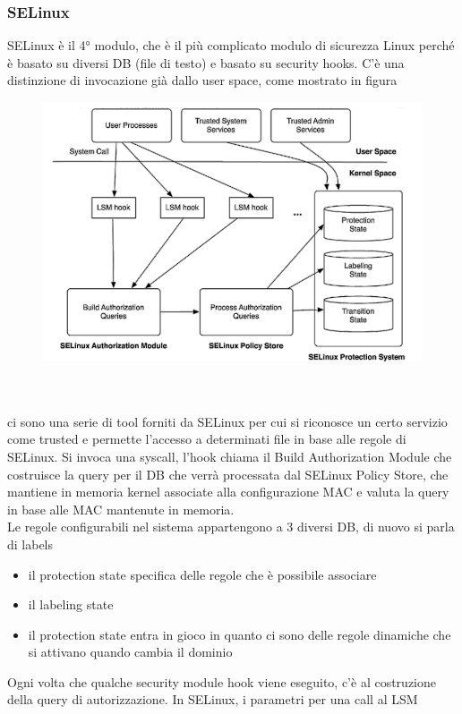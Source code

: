 \documentclass[12pt, oneside]{extbook} %
\begin{document}
\subsubsection{SELinux}
SELinux è il 4° modulo, che è il più complicato modulo di sicurezza Linux perché è basato su diversi DB (file di testo) e basato su security hooks. C'è una distinzione di invocazione già dallo user space, come mostrato in figura\\
\begin{figure}
	\includegraphics[scale=0.2]{immagini/selinux_schema.png}
\end{figure}\\\\
ci sono una serie di tool forniti da SELinux per cui si riconosce un certo servizio come trusted e permette l'accesso a determinati file in base alle regole di SELinux. Si invoca una syscall, l'hook chiama il Build Authorization Module che costruisce la query per il DB che verrà processata dal SELinux Policy Store, che mantiene in memoria kernel associate alla configurazione MAC e valuta la query in base alle MAC mantenute in memoria.\\Le regole configurabili nel sistema appartengono a 3 diversi DB, di nuovo si parla di labels
\begin{itemize}
\item il protection state specifica delle regole che  è possibile associare
\item il labeling state
\item il protection state entra in gioco in quanto ci sono delle regole dinamiche che si attivano quando cambia il dominio
\end{itemize}
Ogni volta che qualche security module hook viene eseguito, c'è al costruzione della query di autorizzazione. In SELinux, i parametri per una call al LSM
\end{document}
